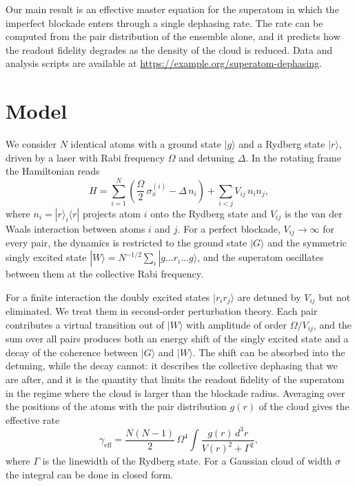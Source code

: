 \documentclass[aps,pra,twocolumn,superscriptaddress,10pt]{revtex4-2}
\begin{document}
Our main result is an effective master equation for the superatom in which
the imperfect blockade enters through a single dephasing rate. The rate can
be computed from the pair distribution of the ensemble alone, and it predicts
how the readout fidelity degrades as the density of the cloud is reduced.
Data and analysis scripts are available at
\url{https://example.org/superatom-dephasing}.

\section{Model}

We consider $N$ identical atoms with a ground state $|g\rangle$ and a Rydberg
state $|r\rangle$, driven by a laser with Rabi frequency $\Omega$ and detuning
$\Delta$. In the rotating frame the Hamiltonian reads
\begin{equation}
H = \sum_{i=1}^{N} \left( \frac{\Omega}{2}\,\sigma_{x}^{(i)} - \Delta\, n_{i} \right)
  + \sum_{i<j} V_{ij}\, n_{i} n_{j},
\label{eq:hamiltonian}
\end{equation}
where $n_{i} = |r\rangle_{i}\langle r|$ projects atom $i$ onto the Rydberg
state and $V_{ij}$ is the van der Waals interaction between atoms $i$ and $j$.
For a perfect blockade, $V_{ij} \to \infty$ for every pair, the dynamics is
restricted to the ground state $|G\rangle$ and the symmetric singly excited
state $|W\rangle = N^{-1/2} \sum_{i} |g \dots r_{i} \dots g\rangle$, and the
superatom oscillates between them at the collective Rabi frequency.

For a finite interaction the doubly excited states $|r_{i} r_{j}\rangle$ are
detuned by $V_{ij}$ but not eliminated. We treat them in second-order
perturbation theory. Each pair contributes a virtual transition out of
$|W\rangle$ with amplitude of order $\Omega/V_{ij}$, and the sum over all pairs
produces both an energy shift of the singly excited state and a decay of the
coherence between $|G\rangle$ and $|W\rangle$. The shift can be absorbed into
the detuning, while the decay cannot: it describes the collective dephasing
that we are after, and it is the quantity that limits the readout fidelity of
the superatom in the regime where the cloud is larger than the blockade
radius. Averaging over the positions of the atoms with the pair distribution
$g(r)$ of the cloud gives the effective rate
\begin{equation}
\gamma_{\mathrm{eff}} = \frac{N(N-1)}{2}\,\Omega^{4}
  \int \frac{g(r)\, d^{3}r}{V(r)^{2} + \Gamma^{2}},
\label{eq:rate}
\end{equation}
where $\Gamma$ is the linewidth of the Rydberg state. For a Gaussian cloud of
width $\sigma$ the integral can be done in closed form.
\end{document}
